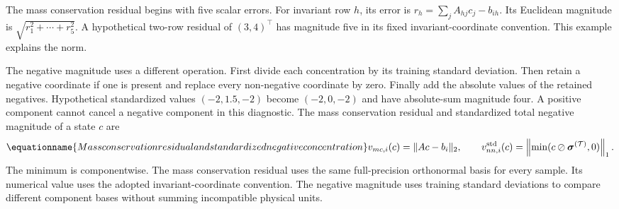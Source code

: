 The mass conservation residual begins with five scalar errors. For invariant row $h$, its error is $r_h=\sum_jA_{hj}c_j-b_{ih}$. Its Euclidean magnitude is $\sqrt{r_1^2+\cdots+r_5^2}$. A hypothetical two-row residual of $(3,4)^\top$ has magnitude five in its fixed invariant-coordinate convention. This example explains the norm.

The negative magnitude uses a different operation. First divide each concentration by its training standard deviation. Then retain a negative coordinate if one is present and replace every non-negative coordinate by zero. Finally add the absolute values of the retained negatives. Hypothetical standardized values $(-2,1.5,-2)$ become $(-2,0,-2)$ and have absolute-sum magnitude four. A positive component cannot cancel a negative component in this diagnostic. The mass conservation residual and standardized total negative magnitude of a state $c$ are
\begin{equation}
\equationname{Mass conservation residual and standardized negative concentration}
v_{mc,i}(c)=\|Ac-b_i\|_2,\qquad
v_{nn,i}^{\mathrm{std}}(c)=
\left\|\min(c\oslash\boldsymbol{\sigma}^{(\mathcal{T})},0)\right\|_1.
\label{eq:projection_violation_magnitudes}
\end{equation}
The minimum is componentwise. The mass conservation residual uses the same full-precision orthonormal basis for every sample. Its numerical value uses the adopted invariant-coordinate convention. The negative magnitude uses training standard deviations to compare different component bases without summing incompatible physical units.

